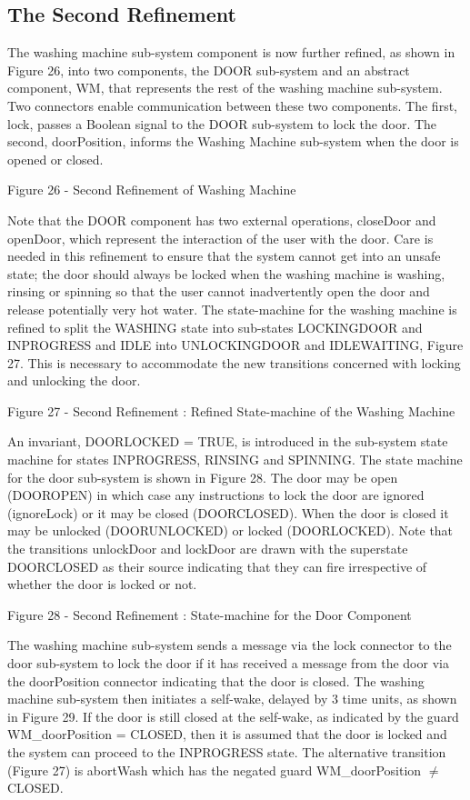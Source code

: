 \subsection{The Second Refinement}
\label{sec:component_diagrams-tutorial_secondRefinement}


The washing machine sub-system component is now further refined, as shown in Figure 26, into two components, the DOOR sub-system and an abstract component, WM, that represents the rest of the washing machine sub-system. Two connectors enable communication between these two components. The first, lock, passes a Boolean signal to the DOOR sub-system to lock the door. The second, doorPosition, informs the Washing Machine sub-system when the door is opened or closed.
 
Figure 26 - Second Refinement of Washing Machine

Note that the DOOR component has two external operations, closeDoor and openDoor, which represent the interaction of the user with the door. Care is needed in this refinement to ensure that the system cannot get into an unsafe state; the door should always be locked when the washing machine is washing, rinsing or spinning so that the user cannot inadvertently open the door and release potentially very hot water.
The state-machine for the washing machine is refined to split the WASHING state into sub-states LOCKINGDOOR and INPROGRESS and IDLE into UNLOCKINGDOOR and IDLEWAITING, Figure 27. This is necessary to accommodate the new transitions concerned with locking and unlocking the door.
 
Figure 27 - Second Refinement : Refined State-machine of the Washing Machine

An invariant, DOORLOCKED  = TRUE, is introduced in the sub-system state machine for states INPROGRESS, RINSING and SPINNING.
The state machine for the door sub-system is shown in Figure 28. The door may be open (DOOROPEN) in which case any instructions to lock the door are ignored (ignoreLock) or it may be closed (DOORCLOSED). When the door is closed it may be unlocked (DOORUNLOCKED) or locked (DOORLOCKED). Note that the transitions unlockDoor and lockDoor are drawn with the superstate DOORCLOSED as their source indicating that they can fire irrespective of whether the door is locked or not.
 
Figure 28 - Second Refinement : State-machine for the Door Component

The washing machine sub-system sends a message via the lock connector to the door sub-system to lock the door if it has received a message from the door via the doorPosition connector indicating that the door is closed.  The washing machine sub-system then initiates a self-wake, delayed by 3 time units, as shown in Figure 29. If the door is still closed at the self-wake, as indicated by the guard 
WM\_doorPosition = CLOSED,  then it is assumed that the door is locked and the system can proceed to the INPROGRESS state. The alternative transition (Figure 27) is abortWash which has the negated guard  WM\_doorPosition $\neq$ CLOSED.
 
